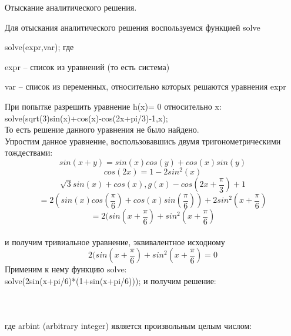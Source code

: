 \documentclass[russian,utf8,nocolumnxxxi,nocolumnxxxii]{eskdtext}
\begin{document}
Отыскание аналитического решения.

Для отыскания аналитического решения воспользуемся функцией solve 

solve(expr,var); где

expr – список из уравнений (то есть система)

var – список из переменных, относительно которых решаются уравнения expr

При попытке разрешить уравнение h(x)= 0 относительно x:\\
solve(sqrt(3)sin(x)+cos(x)-cos(2x+pi/3)-1,x);\\

То есть решение данного уравнения не было найдено.\\
Упростим данное уравнение, воспользовавшись двумя тригонометрическими тождествами: $$sin(x+y)=sin(x)cos(y)+cos(x)sin(y)$$
$$cos(2x)=1-2sin^2(x) $$
$$\sqrt{3}sin(x)+cos(x),g(x)-cos(2x+\frac{\pi}{3})+1$$ $$=2(sin(x)cos(\frac{\pi}{6})+cos(x)sin(\frac{\pi}{6}))+2sin^2(x+\frac{\pi}{6})$$ $$=2(sin(x+\frac{\pi}{6})+sin^2(x+\frac{\pi}{6})$$\\
и получим тривиальное уравнение, эквивалентное исходному
$$2(sin(x+\frac{\pi}{6})+sin^2(x+\frac{\pi}{6})=0$$
Применим к нему функцию solve:\\
solve(2sin(x+pi/6)*(1+sin(x+pi/6)));
и получим решение:
\newpage

\begin{figure}[H]
\begin{center}
\begin{minipage}[h]{0.65\linewidth}
  \\
\frametitle{}
\end{minipage}
\end{center}
\end{figure}


где arbint (arbitrary integer) является произвольным целым числом:
\end{document}
